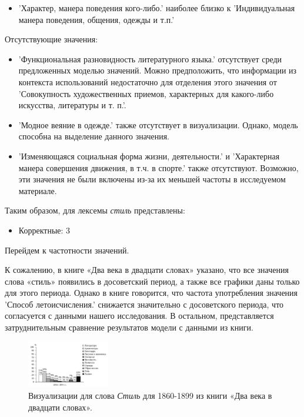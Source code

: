 \begin{itemize}
    \item ’Характер, манера поведения кого-либо.’ наиболее близко к
’Индивидуальная манера поведения, общения, одежды и т.п.’
\end{itemize}

Отсутствующие значения:
\begin{itemize}
    \item ’Функциональная разновидность литературного языка.’ отсутствует среди предложенных моделью значений.
Можно предположить, что информации из контекста использований недостаточно для отделения этого значения от ’Совокупность художественных приемов, характерных для какого-либо искусства, литературы и т. п.’.

    \item ’Модное веяние в одежде.’ также отсутствует в визуализации.
Однако, модель способна на выделение данного значения.

    \item ’Изменяющаяся социальная форма жизни, деятельности.’ и ’Характерная манера совершения движения, в т.ч. в спорте.’ также отсутствуют.
Возможно, эти значения не были включены из-за их меньшей частоты в исследуемом материале.
\end{itemize}

Таким образом, для лексемы \textit{стиль} представлены:

\begin{itemize}
    \item Корректные: 3
\end{itemize}

Перейдем к частотности значений.

К сожалению, в книге «Два века в двадцати словах» указано,
что все значения слова «стиль» появились в досоветский период,
а также все графики даны только для этого периода.
Однако в книге говорится, что частота употребления значения ’Способ летоисчисления.’
снижается значительно с досоветского периода, что согласуется с данными нашего исследования.
В остальном, представляется затруднительным сравнение результатов модели с данными из книги.

\begin{figure}[H]
    \centering %
    \includegraphics[width=0.32\textwidth]{img/book/stil'/1860-1899}
    \caption{Визуализации для слова \textit{Стиль} для 1860-1899 из книги «Два века в двадцати словах».}
    \label{fig:Стиль}
\end{figure}

